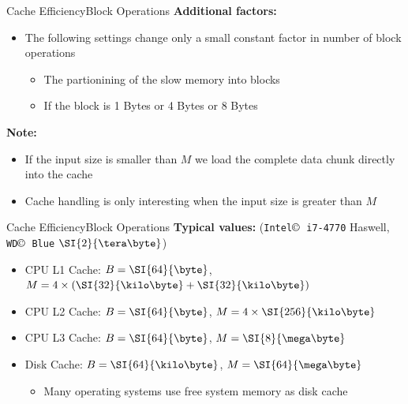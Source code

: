 \begin{frame}{Cache Efficiency}{Block Operations}
  \textbf{Additional factors:}\\
  \begin{itemize}
    \item<2->
    The following settings change only a small constant factor in number of block operations
    \begin{itemize}
    \item<3-> The partionining of the slow memory into blocks
    \item<4-> If the block is {\color{Mittel-Blau}1 Bytes} or
      {\color{Mittel-Blau}4 Bytes} or {\color{Mittel-Blau}8 Bytes}
    \end{itemize}
  \end{itemize}
  \vspace{1.0em}
  \textbf{Note:}\\
  \begin{itemize}
    \item<6->
      If the {\color{Mittel-Blau}input size} is
      {\color{Mittel-Blau}smaller than $M$} we load the complete data chunk
      directly into the cache
    \item<7->
      Cache handling is only interesting when the
      {\color{Mittel-Blau}input size} is
      {\color{Mittel-Blau}greater than $M$}
  \end{itemize}
\end{frame}


\begin{frame}{Cache Efficiency}{Block Operations}
  \textbf{Typical values:}
  (\texttt{Intel$\copyright$ i7-4770} Haswell,
  \texttt{WD$\copyright$ Blue} $\SI{2}{\tera\byte}$)
  \begin{itemize}
    \item<2->
      CPU L1 Cache: {\color{Mittel-Blau}$B = \SI{64}{\byte}$},
      {\color{Mittel-Blau}$M = 4 \times (\SI{32}{\kilo\byte} + \SI{32}{\kilo\byte})$}
    \item<3->
      CPU L2 Cache: {\color{Mittel-Blau}$B = \SI{64}{\byte}$}, {\color{Mittel-Blau}$M = 4 \times \SI{256}{\kilo\byte}$}
    \item<4->
      CPU L3 Cache: {\color{Mittel-Blau}$B = \SI{64}{\byte}$}, {\color{Mittel-Blau}$M = \SI{8}{\mega\byte}$}
    \item<4->
      Disk Cache: {\color{Mittel-Blau}$B = \SI{64}{\kilo\byte}$}, {\color{Mittel-Blau}$M = \SI{64}{\mega\byte}$}
    \begin{itemize}
      \item<5->
        Many operating systems use free system memory as disk cache
    \end{itemize}
  \end{itemize}
\end{frame}

